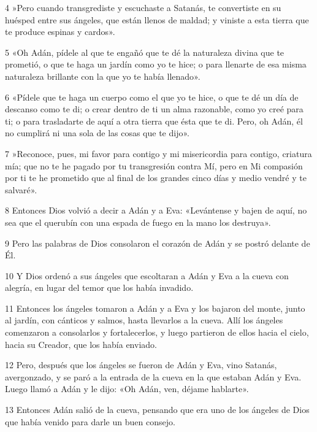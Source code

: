 \par 4 »Pero cuando transgrediste y escuchaste a Satanás, te convertiste en su huésped entre sus ángeles, que están llenos de maldad; y viniste a esta tierra que te produce espinas y cardos».

\par 5 «Oh Adán, pídele al que te engañó que te dé la naturaleza divina que te prometió, o que te haga un jardín como yo te hice; o para llenarte de esa misma naturaleza brillante con la que yo te había llenado».

\par 6 «Pídele que te haga un cuerpo como el que yo te hice, o que te dé un día de descanso como te di; o crear dentro de ti un alma razonable, como yo creé para ti; o para trasladarte de aquí a otra tierra que ésta que te di. Pero, oh Adán, él no cumplirá ni una sola de las cosas que te dijo».

\par 7 »Reconoce, pues, mi favor para contigo y mi misericordia para contigo, criatura mía; que no te he pagado por tu transgresión contra Mí, pero en Mi compasión por ti te he prometido que al final de los grandes cinco días y medio vendré y te salvaré».

\par 8 Entonces Dios volvió a decir a Adán y a Eva: «Levántense y bajen de aquí, no sea que el querubín con una espada de fuego en la mano los destruya».

\par 9 Pero las palabras de Dios consolaron el corazón de Adán y se postró delante de Él.

\par 10 Y Dios ordenó a sus ángeles que escoltaran a Adán y Eva a la cueva con alegría, en lugar del temor que los había invadido.

\par 11 Entonces los ángeles tomaron a Adán y a Eva y los bajaron del monte, junto al jardín, con cánticos y salmos, hasta llevarlos a la cueva. Allí los ángeles comenzaron a consolarlos y fortalecerlos, y luego partieron de ellos hacia el cielo, hacia su Creador, que los había enviado.

\par 12 Pero, después que los ángeles se fueron de Adán y Eva, vino Satanás, avergonzado, y se paró a la entrada de la cueva en la que estaban Adán y Eva. Luego llamó a Adán y le dijo: «Oh Adán, ven, déjame hablarte».

\par 13 Entonces Adán salió de la cueva, pensando que era uno de los ángeles de Dios que había venido para darle un buen consejo.

